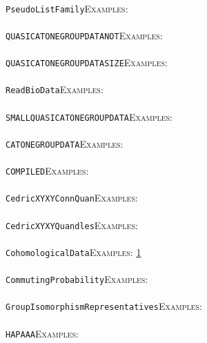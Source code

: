 \documentclass[a4paper,11pt]{report}
\begin{document}
{{ \\
 \texttt{PseudoListFamily}{\nobreakspace}{\nobreakspace}{\nobreakspace}{\nobreakspace}\textsc{Examples:} \\
 \\
 \texttt{QUASICATONEGROUP{\textunderscore}DATA{\textunderscore}NOT}{\nobreakspace}{\nobreakspace}{\nobreakspace}{\nobreakspace}\textsc{Examples:} \\
 \\
 \texttt{QUASICATONEGROUP{\textunderscore}DATA{\textunderscore}SIZE}{\nobreakspace}{\nobreakspace}{\nobreakspace}{\nobreakspace}\textsc{Examples:} \\
 \\
 \texttt{ReadBioData}{\nobreakspace}{\nobreakspace}{\nobreakspace}{\nobreakspace}\textsc{Examples:} \\
 \\
 \texttt{SMALLQUASICATONEGROUP{\textunderscore}DATA}{\nobreakspace}{\nobreakspace}{\nobreakspace}{\nobreakspace}\textsc{Examples:} \\
 \\
 \texttt{CATONEGROUP{\textunderscore}DATA}{\nobreakspace}{\nobreakspace}{\nobreakspace}{\nobreakspace}\textsc{Examples:} \\
 \\
 \texttt{COMPILED}{\nobreakspace}{\nobreakspace}{\nobreakspace}{\nobreakspace}\textsc{Examples:} \\
 \\
 \texttt{Cedric{\textunderscore}XYXYConnQuan}{\nobreakspace}{\nobreakspace}{\nobreakspace}{\nobreakspace}\textsc{Examples:} \\
 \\
 \texttt{Cedric{\textunderscore}XYXYQuandles}{\nobreakspace}{\nobreakspace}{\nobreakspace}{\nobreakspace}\textsc{Examples:} \\
 \\
 \texttt{CohomologicalData}{\nobreakspace}{\nobreakspace}{\nobreakspace}{\nobreakspace}\textsc{Examples:} \href{tutorial/chap7.html} {1}{\nobreakspace} \\
 \\
 \texttt{CommutingProbability}{\nobreakspace}{\nobreakspace}{\nobreakspace}{\nobreakspace}\textsc{Examples:} \\
 \\
 \texttt{GroupIsomorphismRepresentatives}{\nobreakspace}{\nobreakspace}{\nobreakspace}{\nobreakspace}\textsc{Examples:} \\
 \\
 \texttt{HAPAAA}{\nobreakspace}{\nobreakspace}{\nobreakspace}{\nobreakspace}\textsc{Examples:} \\
}}
\end{document}
